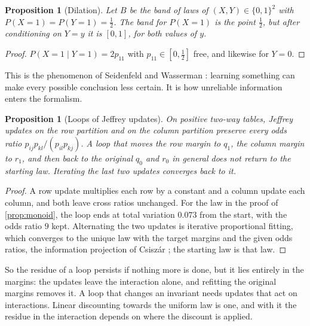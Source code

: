 \documentclass[11pt]{article}
\newtheorem{proposition}[theorem]{Proposition}
\theoremstyle{definition}
\theoremstyle{remark}
\begin{document}
\begin{proposition}[Dilation]\label{prop:dilation}
Let $B$ be the band of laws of $(X,Y)\in\{0,1\}^2$ with $P(X=1)=P(Y=1)=\frac12$. The band for $P(X=1)$ is the point $\frac12$,
but after conditioning on $Y=y$ it is $[0,1]$, for both values of $y$.
\end{proposition}
\begin{proof}
$P(X=1\mid Y=1)=2p_{11}$ with $p_{11}\in[0,\frac12]$ free, and likewise for $Y=0$.
\end{proof}

This is the phenomenon of Seidenfeld and Wasserman \cite{SeidenfeldWasserman1993}: learning something can make every
possible conclusion less certain. It is how unreliable information enters the formalism.

\begin{proposition}[Loops of Jeffrey updates]\label{prop:loop}
On positive two-way tables, Jeffrey updates on the row partition and on the column partition preserve every odds ratio
$p_{ij}p_{kl}/(p_{il}p_{kj})$. A loop that moves the row margin to $q_1$, the column margin to $r_1$, and then back to the
original $q_0$ and $r_0$ in general does not return to the starting law. Iterating the last two updates converges back to it.
\end{proposition}
\begin{proof}
A row update multiplies each row by a constant and a column update each column, and both leave cross ratios unchanged. For
the law in the proof of \cref{prop:monoid}, the loop ends at total variation $0.073$ from the start, with the odds ratio $9$ kept.
Alternating the two updates is iterative proportional fitting, which converges to the unique law with the target margins and the
given odds ratios, the information projection of Csiszár \cite{Csiszar1975}; the starting law is that law.
\end{proof}

So the residue of a loop persists if nothing more is done, but it lies entirely in the margins: the updates leave the interaction
alone, and refitting the original margins removes it. A loop that changes an invariant needs updates that act on interactions.
Linear discounting towards the uniform law is one, and with it the residue in the interaction depends on where the discount is applied.
\end{document}
